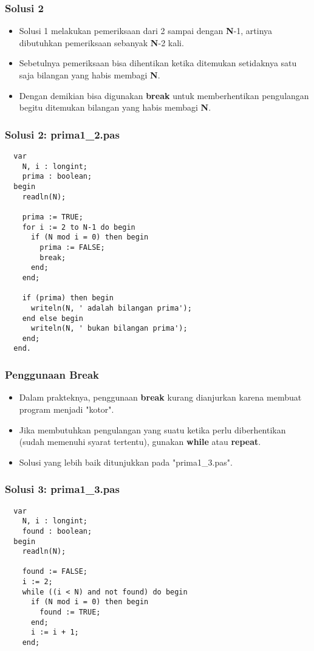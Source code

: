 \documentclass{beamer}
\begin{document}
\begin{frame}
\frametitle{Solusi 2}
\begin{itemize}
  \item Solusi 1 melakukan pemeriksaan dari 2 sampai dengan \textbf{N}-1, artinya dibutuhkan pemeriksaan sebanyak \textbf{N}-2 kali.
  \item Sebetulnya pemeriksaan bisa dihentikan ketika ditemukan setidaknya satu saja bilangan yang habis membagi \textbf{N}.
  \item Dengan demikian bisa digunakan \textbf{break} untuk memberhentikan pengulangan begitu ditemukan bilangan yang habis membagi \textbf{N}.
\end{itemize}
\end{frame}

\begin{frame}[fragile]
\frametitle{Solusi 2: prima1\_2.pas}
\begin{lstlisting}
  var
    N, i : longint;
    prima : boolean;
  begin
    readln(N);

    prima := TRUE;
    for i := 2 to N-1 do begin
      if (N mod i = 0) then begin
        prima := FALSE;
        break;
      end;
    end;

    if (prima) then begin
      writeln(N, ' adalah bilangan prima');
    end else begin
      writeln(N, ' bukan bilangan prima');
    end;
  end.
\end{lstlisting}
\end{frame}

\begin{frame}
\frametitle{Penggunaan Break}
\begin{itemize}
  \item Dalam prakteknya, penggunaan \textbf{break} kurang dianjurkan karena membuat program menjadi "kotor".
  \item Jika membutuhkan pengulangan yang suatu ketika perlu diberhentikan (sudah memenuhi syarat tertentu), gunakan \textbf{while} atau \textbf{repeat}.
  \item Solusi yang lebih baik ditunjukkan pada "prima1\_3.pas".
\end{itemize}
\end{frame}

\begin{frame}[fragile]
\frametitle{Solusi 3: prima1\_3.pas}
\begin{lstlisting}
  var
    N, i : longint;
    found : boolean;
  begin
    readln(N);

    found := FALSE;
    i := 2;
    while ((i < N) and not found) do begin
      if (N mod i = 0) then begin
        found := TRUE;
      end;
      i := i + 1;
    end;
\end{lstlisting}
\end{frame}
\end{document}
